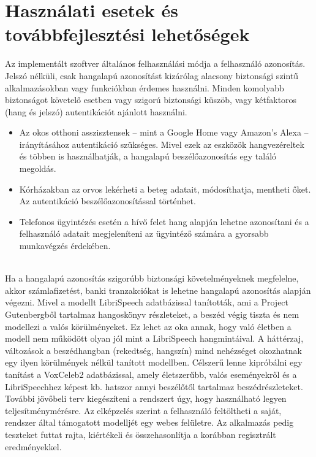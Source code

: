 \section{Használati esetek és továbbfejlesztési lehetőségek}

Az implementált szoftver általános felhasználási módja a felhasználó azonosítás. Jelszó nélküli, csak hangalapú azonosítást kizárólag alacsony biztonsági szintű alkalmazásokban vagy funkciókban érdemes használni. Minden komolyabb biztonságot követelő esetben vagy szigorú biztonsági küszöb, vagy kétfaktoros (hang és jelszó) autentikációt ajánlott használni.
\begin{itemize}
	\item Az okos otthoni asszisztensek -- mint a Google Home vagy Amazon's Alexa -- irányításához autentikáció szükséges. Mivel ezek az eszközök hangvezéreltek és többen is használhatják, a hangalapú beszélőazonosítás egy találó megoldás.
	\item Kórházakban az orvos lekérheti a beteg adatait, módosíthatja, mentheti őket. Az autentikáció beszélőazonosítással történhet.
	\item Telefonos ügyintézés esetén a hívő felet hang alapján lehetne azonosítani és a felhasználó adatait megjeleníteni az ügyintéző számára a gyorsabb munkavégzés érdekében.
\end{itemize}
\ \\
Ha a hangalapú azonosítás szigorúbb biztonsági követelményeknek megfelelne, akkor számlafizetést, banki tranzakciókat is lehetne hangalapú azonosítás alapján végezni.
\newline
\newline
Mivel a modellt LibriSpeech adatbázissal tanították, ami a Project Gutenbergből tartalmaz hangoskönyv részleteket, a beszéd végig tiszta és nem modellezi a valós körülményeket. Ez lehet az oka annak, hogy való életben a modell nem működött olyan jól mint a LibriSpeech hangmintáival.
\newline
\newline
A háttérzaj, változások a beszédhangban (rekedtség, hangszín) mind nehézséget okozhatnak egy ilyen körülmények nélkül tanított modellben. Célszerű lenne kipróbálni egy tanítást a VoxCeleb2 adatbázissal, amely életszerűbb, valós eseményekről és a LibriSpeechhez képest kb. hatszor annyi beszélőtől tartalmaz beszédrészleteket.
\newline
\newline
További jövőbeli terv kiegészíteni a rendszert úgy, hogy használható legyen teljesítménymérésre. Az elképzelés szerint a felhasználó feltöltheti a saját, rendszer által támogatott modelljét egy webes felületre. Az alkalmazás pedig teszteket futtat rajta, kiértékeli és összehasonlítja a korábban regisztrált eredményekkel.